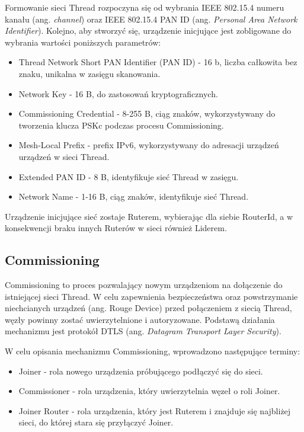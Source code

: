     Formowanie sieci Thread rozpoczyna się od wybrania IEEE 802.15.4 numeru kanału (ang. \textit{channel}) oraz IEEE 802.15.4 PAN ID (ang. \textit{Personal Area Network Identifier}). Kolejno, aby stworzyć się, urządzenie inicjujące jest zobligowane do wybrania wartości poniższych parametrów:
    \begin{itemize}
        \item Thread Network Short PAN Identifier (PAN ID) - 16 b, liczba całkowita bez znaku, unikalna w zasięgu skanowania.
        \item Network Key - 16 B, do zastosowań kryptograficznych.
        \item Commissioning Credential - 8-255 B, ciąg znaków, wykorzystywany do tworzenia klucza PSKc podczas procesu Commissioning.
        \item Mesh-Local Prefix - prefix IPv6, wykorzystywany do adresacji urządzeń urządzeń w sieci Thread.
        \item Extended PAN ID - 8 B, identyfikuje sieć Thread w zasięgu.
        \item Network Name - 1-16 B, ciąg znaków, identyfikuje sieć Thread.
    \end{itemize}{}

    Urządzenie inicjujące sieć zostaje Ruterem, wybierając dla siebie RouterId, a w konsekwencji braku innych Ruterów w sieci również Liderem.

    \subsection{Commissioning}
    \label{subsec:commissioning}

    Commissioning to proces pozwalający nowym urządzeniom na dołączenie do istniejącej sieci Thread. W celu zapewnienia bezpieczeństwa oraz powstrzymanie niechcianych urządzeń (ang. Rouge Device) przed połączeniem z siecią Thread, węzły powinny zostać uwierzytelnione i autoryzowane. Podstawą działania mechanizmu jest protokół DTLS (ang. \textit{Datagram Transport Layer Security}).

    W celu opisania mechanizmu Commissioning, wprowadzono następujące terminy:
    \begin{itemize}
        \item Joiner - rola nowego urządzenia próbującego podłączyć się do sieci.
        \item Commissioner - rola urządzenia, który uwierzytelnia węzeł o roli Joiner.
        \item Joiner Router - rola urządzenia, który jest Ruterem i znajduje się najbliżej sieci, do której stara się przyłączyć Joiner.
    \end{itemize}

